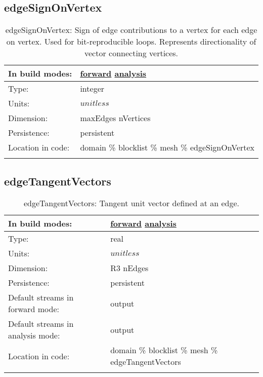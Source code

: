 \subsection[edgeSignOnVertex]{edgeSignOnVertex}
\label{subsec:var_sec_mesh_edgeSignOnVertex}
\begin{center}
\begin{longtable}{| p{2.0in} | p{4.0in} |}
        \hline 
        In build modes: & \hyperref[subsec:forward_var_tab_mesh]{forward} \hyperref[subsec:analysis_var_tab_mesh]{analysis} \\
        \hline 
        Type: & integer \\
        \hline 
        Units: & $unitless$ \\
        \hline 
        Dimension: & maxEdges nVertices \\
        \hline 
        Persistence: & persistent \\
        \hline 
		 Location in code: & domain \% blocklist \% mesh \% edgeSignOnVertex \\
		 \hline 
    \caption{edgeSignOnVertex: Sign of edge contributions to a vertex for each edge on vertex. Used for bit-reproducible loops. Represents directionality of vector connecting vertices.}
\end{longtable}
\end{center}
\subsection[edgeTangentVectors]{edgeTangentVectors}
\label{subsec:var_sec_mesh_edgeTangentVectors}
\begin{center}
\begin{longtable}{| p{2.0in} | p{4.0in} |}
        \hline 
        In build modes: & \hyperref[subsec:forward_var_tab_mesh]{forward} \hyperref[subsec:analysis_var_tab_mesh]{analysis} \\
        \hline 
        Type: & real \\
        \hline 
        Units: & $unitless$ \\
        \hline 
        Dimension: & R3 nEdges \\
        \hline 
        Persistence: & persistent \\
        \hline 
		 Default streams in forward mode: &  output \\
        \hline 
		 Default streams in analysis mode: &  output \\
        \hline 
		 Location in code: & domain \% blocklist \% mesh \% edgeTangentVectors \\
		 \hline 
    \caption{edgeTangentVectors: Tangent unit vector defined at an edge.}
\end{longtable}
\end{center}
